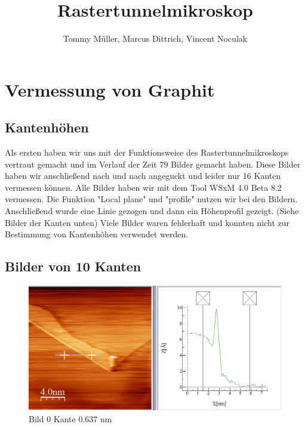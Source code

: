 \documentclass[10pt,a4paper]{article}
\author{Tommy Müller, Marcus Dittrich, Vincent Noculak}
\title{Rastertunnelmikroskop}
\begin{document}
\maketitle
\newpage
\tableofcontents
\newpage

\section{Vermessung von Graphit }

\subsection{ Kantenhöhen}

Als ersten haben wir uns mit der Funktionsweise des Rastertunnelmikroskops vertraut gemacht und im Verlauf der Zeit 79 Bilder gemacht haben. 
Diese Bilder haben wir anschließend nach und nach angeguckt und leider nur 16 Kanten vermessen können. Alle Bilder haben wir mit dem Tool WSxM 4.0 Beta 8.2 vermessen. 
Die Funktion "Local plane" und "profile" nutzen wir bei den Bildern. Anschließend wurde eine Linie gezogen und dann ein Höhenprofil gezeigt. (Siehe Bilder der Kanten unten)
Viele Bilder waren fehlerhaft und konnten nicht zur Bestimmung von Kantenhöhen verwendet werden.



\subsection{ Bilder von 10 Kanten}

\begin{figure}[]
	\includegraphics[scale = 0.2]{bild00.png}
	\centering
	\caption{Bild 0 Kante 0.637 nm}
	\label{b0}
\end{figure}
\end{document}
